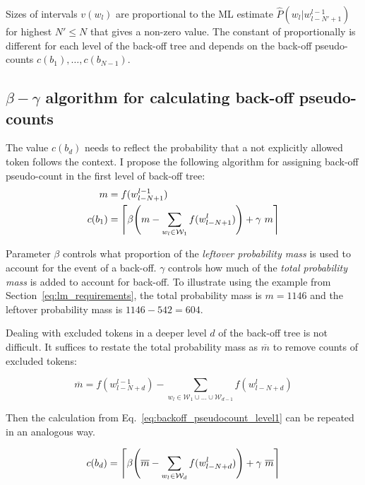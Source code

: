 \documentclass{IIBproject}
\DeclarePairedDelimiter{\ceil}{\lceil}{\rceil}
\DeclarePairedDelimiter{\bracket}{(}{)}
\begin{document}
Sizes of intervals $v(w_l)$ are proportional to the ML estimate $\hat P(w_l | w_{l-N'+1}^{l-1})$ for highest $N' \le N$ that gives a non-zero value. The constant of proportionally is different for each level of the back-off tree and depends on the back-off pseudo-counts $c(b_1), \dots, c(b_{N-1})$.

\subsection{$\beta-\gamma$ algorithm for calculating back-off pseudo-counts}

The value $c(b_d)$ needs to reflect the probability that a not explicitly allowed token follows the context. I propose the following algorithm for assigning back-off pseudo-count in the first level of back-off tree:
%
\begin{align}
\label{eq:total_probability_mass} m &= f(w_{l-N+1}^{l-1}) \\
\label{eq:backoff_pseudocount_level1} c(b_1) &= \ceil*{ \beta \bracket*{ m - \sum_{w_l \in \mathcal W_1} f(w_{l-N+1}^l) } + \gamma ~ m }
\end{align}

Parameter $\beta$ controls what proportion of the \emph{leftover probability mass} is used to account for the event of a back-off. $\gamma$ controls how much of the \emph{total probability mass} is added to account for back-off. To illustrate using the example from Section~\ref{eq:lm_requirements}, the total probability mass is $m = 1146$ and the leftover probability mass is $1146-542=604$.

Dealing with excluded tokens in a deeper level $d$ of the back-off tree is not difficult. It suffices to restate the total probability mass as $\overline m$ to remove counts of excluded tokens:

\begin{equation}
\label{eq:adjusted_total_probability_mass}
\overline m = f(w_{l-N+d}^{l-1}) - \sum_{w_l \in \mathcal W_1 \cup \dots \cup \mathcal W_{d-1}} f(w_{l-N+d}^l)
\end{equation}

Then the calculation from Eq.~\ref{eq:backoff_pseudocount_level1} can be repeated in an analogous way.

\begin{equation}
\label{eq:backoff_pseudocount_deep_levels}
c(b_d) = \ceil*{ \beta \bracket*{ \overline m - \sum_{w_l \in \mathcal W_d} f(w_{l-N+d}^l) } + \gamma ~ \overline m }
\end{equation}
\end{document}
